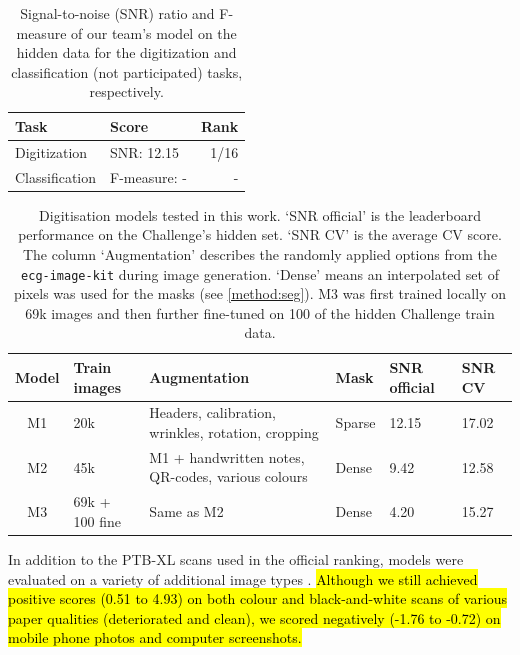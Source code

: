 \documentclass[twocolumn]{cinc}
\newcommand{\cG}[1]{{\sethlcolor{cGapBg}\hl{#1}}}
\begin{document}
\begin{table}[!ht]
    \centering
   \begin{tabular}{llr}
    \hline\hline
    Task & Score & Rank \\
        \hline
            Digitization    & SNR: 12.15  & 1/16 \\
            Classification & F-measure: - & - \\
        \hline\hline
    \end{tabular}
    \caption{Signal-to-noise (SNR) ratio and F-measure of our team’s model on the hidden data for the digitization and classification (not participated) tasks, respectively.}
    \label{tab:rank}
\end{table}

\begin{table}[!ht]
    \centering
   \begin{tabular}{clllll}
    \hline\hline
    Model & Train images & Augmentation & Mask & SNR official & SNR CV \\
        \hline
            M1  & 20k   & Headers, calibration, wrinkles, rotation, cropping & Sparse     & 12.15    & 17.02 \\
            M2  & 45k   & M1 + handwritten notes, QR-codes, various colours & Dense     &  9.42     & 12.58   \\
            M3  & 69k + 100 fine & Same as M2 & Dense     &  4.20     & 15.27   \\
        \hline\hline
    \end{tabular}
    \caption{Digitisation models tested in this work. `SNR official' is the leaderboard performance on the Challenge’s hidden set. `SNR CV' is the average CV score. The column `Augmentation' describes the randomly applied options from the \texttt{ecg-image-kit} during image generation. `Dense' means an interpolated set of pixels was used for the masks (see \ref{method:seg}). M3 was first trained locally on 69k images and then further fine-tuned on 100 of the hidden Challenge train data.}
    \label{tab:scores}
\end{table}

In addition to the PTB-XL scans used in the official ranking, models were evaluated on a variety of additional image types \cite{challenge2024data}. \cG{Although we still achieved positive scores (0.51 to 4.93) on both colour and black-and-white scans of various paper qualities (deteriorated and clean), we scored negatively (-1.76 to -0.72) on mobile phone photos and computer screenshots.}
\end{document}
